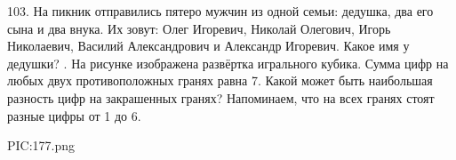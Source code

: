103. На пикник отправились пятеро мужчин из одной семьи: дедушка, два его сына и два внука. Их зовут: Олег Игоревич, Николай Олегович, Игорь Николаевич, Василий Александрович и Александр Игоревич. Какое имя у дедушки?\newpage
{}. На рисунке изображена развёртка игрального кубика. Сумма цифр на любых двух противоположных гранях равна 7. Какой может быть наибольшая разность цифр на закрашенных гранях? Напоминаем, что на всех гранях стоят разные цифры от 1 до 6.
\begin{center}
{{PIC:177.png}}
\end{center}
